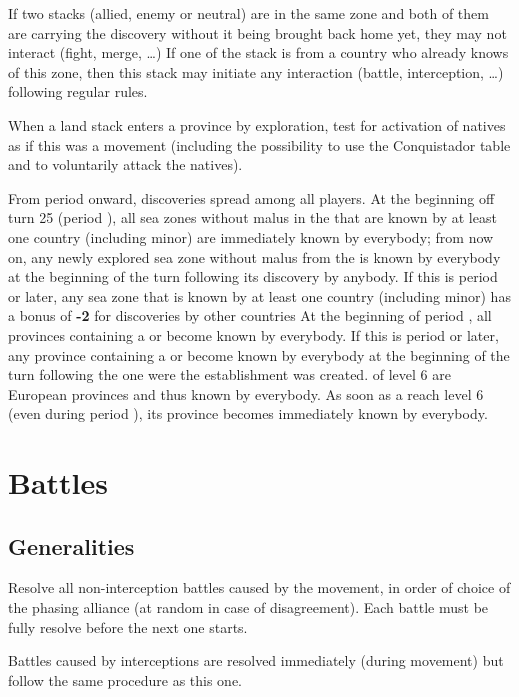 If two stacks (allied, enemy or neutral) are in the same zone and both of them
are carrying the discovery without it being brought back home yet, they may
not interact (fight, merge, \ldots) If one of the stack is from a country who
already knows of this zone, then this stack may initiate any interaction
(battle, interception, \ldots) following regular rules.

When a land stack enters a province by exploration, test for activation of
natives as if this was a movement (including the possibility to use the
Conquistador table and to voluntarily attack the natives).

\bparag From period  onward, discoveries spread among all players.
\bparag[Atlantic] At the beginning off turn 25 (period ), all sea
zones without malus in the  that are known by at least one
country (including minor) are immediately known by everybody; from now on, any
newly explored sea zone without malus from the  is known by
everybody at the beginning of the turn following its discovery by anybody.
\bparag[On sea] If this is period  or later, any sea zone that is
known by at least one country (including minor) has a bonus of {\bf -2} for
discoveries by other countries
\bparag [On land] At the beginning of period , all provinces
containing a \COL or \TP become known by everybody.
\bparag [On land] If this is period  or later, any province
containing a \COL or \TP become known by everybody at the beginning of the
turn following the one were the establishment was created.
\bparag[Level 6] \COL of level 6 are European provinces and thus known by
everybody. As soon as a \COL reach level 6 (even during period ),
its province becomes immediately known by everybody.

\section{Battles}
\label{chMilitary:Battles}
\subsection{Generalities}
Resolve all non-interception battles caused by the movement, in order of
choice of the phasing alliance (at random in case of disagreement). Each
battle must be fully resolve before the next one starts.

Battles caused by interceptions are resolved immediately (during movement) but
follow the same procedure as this one.

